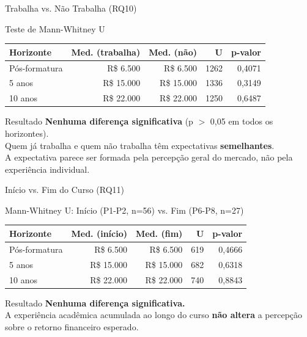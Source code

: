 \documentclass[fleqn]{beamer}
\begin{document}
\begin{frame}{Trabalha vs. Não Trabalha (RQ10)}
\begin{block}{Teste de Mann-Whitney U}
\scriptsize
\begin{tabular}{lrrrr}
\toprule
\textbf{Horizonte} & \textbf{Med. (trabalha)} & \textbf{Med. (não)} & \textbf{U} & \textbf{p-valor} \\
\midrule
Pós-formatura & R\$ 6.500 & R\$ 6.500 & 1262 & 0,4071 \\
5 anos & R\$ 15.000 & R\$ 15.000 & 1336 & 0,3149 \\
10 anos & R\$ 22.000 & R\$ 22.000 & 1250 & 0,6487 \\
\bottomrule
\end{tabular}
\end{block}

\begin{exampleblock}{Resultado}
\textbf{Nenhuma diferença significativa} (p $>$ 0,05 em todos os horizontes).\\
Quem já trabalha e quem não trabalha têm expectativas \textbf{semelhantes}.\\
A expectativa parece ser formada pela percepção geral do mercado, não pela experiência individual.
\end{exampleblock}
\end{frame}

\begin{frame}{Início vs. Fim do Curso (RQ11)}
\small
\begin{block}{Mann-Whitney U: Início (P1-P2, n=56) vs. Fim (P6-P8, n=27)}
\scriptsize
\begin{tabular}{lrrrr}
\toprule
\textbf{Horizonte} & \textbf{Med. (início)} & \textbf{Med. (fim)} & \textbf{U} & \textbf{p-valor} \\
\midrule
Pós-formatura & R\$ 6.500 & R\$ 6.500 & 619 & 0,4666 \\
5 anos & R\$ 15.000 & R\$ 15.000 & 682 & 0,6318 \\
10 anos & R\$ 22.000 & R\$ 22.000 & 740 & 0,8843 \\
\bottomrule
\end{tabular}
\end{block}

\begin{exampleblock}{Resultado}
\textbf{Nenhuma diferença significativa.}\\
A experiência acadêmica acumulada ao longo do curso \textbf{não altera} a percepção sobre o retorno financeiro esperado.
\end{exampleblock}
\end{frame}
\end{document}
